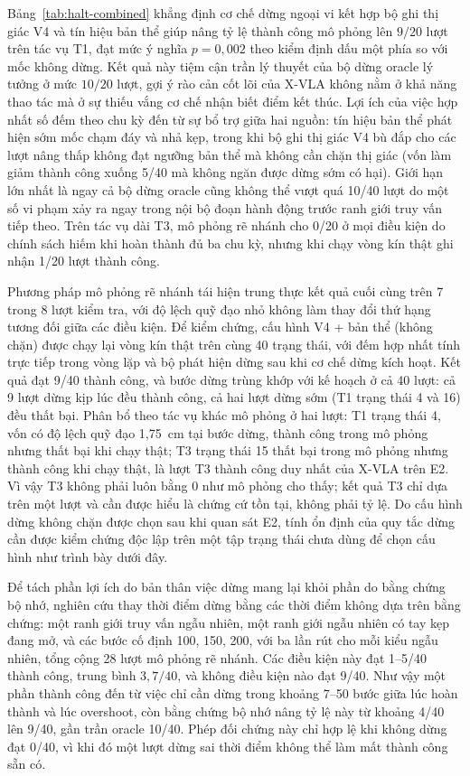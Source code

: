 \label{sec:halt-vs-prior}
Bảng~\ref{tab:halt-combined} khẳng định cơ chế dừng ngoại vi kết hợp bộ ghi thị giác V4 và tín hiệu bản thể giúp nâng tỷ lệ thành công mô phỏng lên $9/20$ lượt trên tác vụ T1, đạt mức ý nghĩa $p = 0{,}002$ theo kiểm định dấu một phía so với mốc không dừng. Kết quả này tiệm cận trần lý thuyết của bộ dừng oracle lý tưởng ở mức $10/20$ lượt, gợi ý rào cản cốt lõi của X-VLA không nằm ở khả năng thao tác mà ở sự thiếu vắng cơ chế nhận biết điểm kết thúc. Lợi ích của việc hợp nhất số đếm theo chu kỳ đến từ sự bổ trợ giữa hai nguồn: tín hiệu bản thể phát hiện sớm mốc chạm đáy và nhả kẹp, trong khi bộ ghi thị giác V4 bù đắp cho các lượt nâng thấp không đạt ngưỡng bản thể mà không cần chặn thị giác (vốn làm giảm thành công xuống 5/40 mà không ngăn được dừng sớm có hại). Giới hạn lớn nhất là ngay cả bộ dừng oracle cũng không thể vượt quá 10/40 lượt do một số vi phạm xảy ra ngay trong nội bộ đoạn hành động trước ranh giới truy vấn tiếp theo. Trên tác vụ dài T3, mô phỏng rẽ nhánh cho 0/20 ở mọi điều kiện do chính sách hiếm khi hoàn thành đủ ba chu kỳ, nhưng khi chạy vòng kín thật ghi nhận 1/20 lượt thành công.

Phương pháp mô phỏng rẽ nhánh tái hiện trung thực kết quả cuối cùng trên 7 trong 8 lượt kiểm tra, với độ lệch quỹ đạo nhỏ không làm thay đổi thứ hạng tương đối giữa các điều kiện. Để kiểm chứng, cấu hình V4 + bản thể (không chặn) được chạy lại vòng kín thật trên cùng 40 trạng thái, với đếm hợp nhất tính trực tiếp trong vòng lặp và bộ phát hiện dừng sau khi cơ chế dừng kích hoạt. Kết quả đạt 9/40 thành công, và bước dừng trùng khớp với kế hoạch ở cả 40 lượt: cả 9 lượt dừng kịp lúc đều thành công, cả hai lượt dừng sớm (T1 trạng thái 4 và 16) đều thất bại. Phân bổ theo tác vụ khác mô phỏng ở hai lượt: T1 trạng thái 4, vốn có độ lệch quỹ đạo 1,75~cm tại bước dừng, thành công trong mô phỏng nhưng thất bại khi chạy thật; T3 trạng thái 15 thất bại trong mô phỏng nhưng thành công khi chạy thật, là lượt T3 thành công duy nhất của X-VLA trên E2. Vì vậy T3 không phải luôn bằng 0 như mô phỏng cho thấy; kết quả T3 chỉ dựa trên một lượt và cần được hiểu là chứng cứ tồn tại, không phải tỷ lệ. Do cấu hình dừng không chặn được chọn sau khi quan sát E2, tính ổn định của quy tắc dừng cần được kiểm chứng độc lập trên một tập trạng thái chưa dùng để chọn cấu hình như trình bày dưới đây.

Để tách phần lợi ích do bản thân việc dừng mang lại khỏi phần do bằng chứng bộ nhớ, nghiên cứu thay thời điểm dừng bằng các thời điểm không dựa trên bằng chứng: một ranh giới truy vấn ngẫu nhiên, một ranh giới ngẫu nhiên có tay kẹp đang mở, và các bước cố định 100, 150, 200, với ba lần rút cho mỗi kiểu ngẫu nhiên, tổng cộng 28 lượt mô phỏng rẽ nhánh. Các điều kiện này đạt 1--5/40 thành công, trung bình $3{,}7/40$, và không điều kiện nào đạt 9/40. Như vậy một phần thành công đến từ việc chỉ cần dừng trong khoảng 7--50 bước giữa lúc hoàn thành và lúc overshoot, còn bằng chứng bộ nhớ nâng tỷ lệ này từ khoảng 4/40 lên 9/40, gần trần oracle 10/40. Phép đối chứng này chỉ hợp lệ khi không dừng đạt 0/40, vì khi đó một lượt dừng sai thời điểm không thể làm mất thành công sẵn có.

